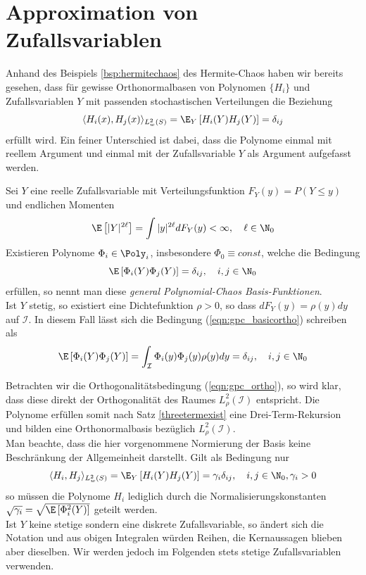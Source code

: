 \section{Approximation von Zufallsvariablen}
Anhand des Beispiels \ref{bsp:hermitechaos} des Hermite-Chaos haben wir bereits gesehen, dass für gewisse Orthonormalbasen von Polynomen $\lbrace H_i\rbrace$ und Zufallsvariablen $Y$ mit passenden stochastischen Verteilungen die Beziehung
\[\langle H_i(x),H_j(x)\rangle_{L_w^2(S)} =\E_Y \left[H_i(Y)H_j(Y)\right]=\delta_{ij}\]
erfüllt wird. Ein feiner Unterschied ist dabei, dass die Polynome einmal mit reellem Argument und einmal mit der Zufallsvariable $Y$ als Argument aufgefasst werden.
\begin{mathdef}
\label{def:gpc}
Sei $Y$ eine reelle Zufallsvariable mit Verteilungsfunktion $F_Y(y)=P(Y\le y)$ und endlichen Momenten
\[\E\left[|Y|^{2\ell}\right]=\int |y|^{2\ell}dF_Y(y)<\infty,\quad \ell\in \N_0\]
Existieren Polynome $\Phi_i\in\Poly_i$, insbesondere $\Phi_0\equiv const$, welche die Bedingung
\begin{equation}
\label{eqn:gpc_basicortho}
\E\left[\Phi_i(Y)\Phi_j(Y)\right]=\delta_{ij},\quad i,j\in\N_0
\end{equation}
erfüllen, so nennt man diese \emph{general Polynomial-Chaos Basis-Funktionen}.\\
Ist $Y$ stetig, so existiert eine Dichtefunktion $\rho>0$, so dass $dF_Y(y)=\rho(y)dy$ auf $\mathcal{I}$. In diesem Fall lässt sich die Bedingung (\ref{eqn:gpc_basicortho}) schreiben als
\begin{equation}
\label{eqn:gpc_ortho}
\E\left[\Phi_i(Y)\Phi_j(Y)\right]=\int_\mathcal{I} \Phi_i(y)\Phi_j(y)\rho(y)dy=\delta_{ij},\quad i,j\in\N_0
\end{equation}
\end{mathdef}
\begin{mathbem}
Betrachten wir die Orthogonalitätsbedingung (\ref{eqn:gpc_ortho}), so wird klar, dass diese direkt der Orthogonalität des Raumes $L_\rho^2(\mathcal{I})$ entspricht. Die Polynome erfüllen somit nach Satz \ref{threetermexist} eine Drei-Term-Rekursion und bilden eine Orthonormalbasis bezüglich $L_\rho^2(\mathcal{I})$.\\
Man beachte, dass die hier vorgenommene Normierung der Basis keine Beschränkung der Allgemeinheit darstellt. Gilt als Bedingung nur
\[\langle H_i,H_j\rangle_{L_w^2(S)} =\E_Y \left[H_i(Y)H_j(Y)\right]=\gamma_i\delta_{ij},\quad i,j\in\N_0,\gamma_i>0\]
so müssen die Polynome $H_i$ lediglich durch die Normalisierungskonstanten $\sqrt{\gamma_i}=\sqrt{\E\left[\Phi_i^2(Y)\right]}$ geteilt werden.\\
Ist $Y$ keine stetige sondern eine diskrete Zufallsvariable, so ändert sich die Notation und aus obigen Integralen würden Reihen, die Kernaussagen blieben aber dieselben. Wir werden jedoch im Folgenden stets stetige Zufallsvariablen verwenden.
\end{mathbem}

